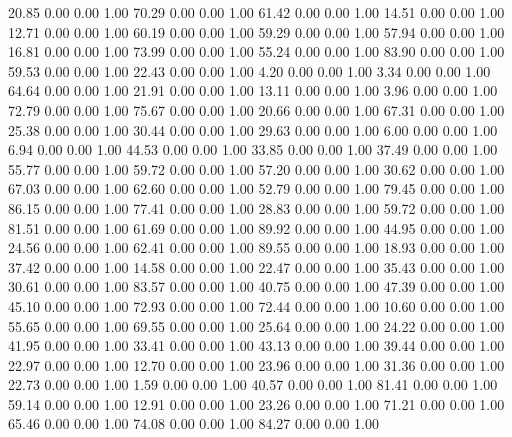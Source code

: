    20.85   0.00   0.00   1.00
   70.29   0.00   0.00   1.00
   61.42   0.00   0.00   1.00
   14.51   0.00   0.00   1.00
   12.71   0.00   0.00   1.00
   60.19   0.00   0.00   1.00
   59.29   0.00   0.00   1.00
   57.94   0.00   0.00   1.00
   16.81   0.00   0.00   1.00
   73.99   0.00   0.00   1.00
   55.24   0.00   0.00   1.00
   83.90   0.00   0.00   1.00
   59.53   0.00   0.00   1.00
   22.43   0.00   0.00   1.00
    4.20   0.00   0.00   1.00
    3.34   0.00   0.00   1.00
   64.64   0.00   0.00   1.00
   21.91   0.00   0.00   1.00
   13.11   0.00   0.00   1.00
    3.96   0.00   0.00   1.00
   72.79   0.00   0.00   1.00
   75.67   0.00   0.00   1.00
   20.66   0.00   0.00   1.00
   67.31   0.00   0.00   1.00
   25.38   0.00   0.00   1.00
   30.44   0.00   0.00   1.00
   29.63   0.00   0.00   1.00
    6.00   0.00   0.00   1.00
    6.94   0.00   0.00   1.00
   44.53   0.00   0.00   1.00
   33.85   0.00   0.00   1.00
   37.49   0.00   0.00   1.00
   55.77   0.00   0.00   1.00
   59.72   0.00   0.00   1.00
   57.20   0.00   0.00   1.00
   30.62   0.00   0.00   1.00
   67.03   0.00   0.00   1.00
   62.60   0.00   0.00   1.00
   52.79   0.00   0.00   1.00
   79.45   0.00   0.00   1.00
   86.15   0.00   0.00   1.00
   77.41   0.00   0.00   1.00
   28.83   0.00   0.00   1.00
   59.72   0.00   0.00   1.00
   81.51   0.00   0.00   1.00
   61.69   0.00   0.00   1.00
   89.92   0.00   0.00   1.00
   44.95   0.00   0.00   1.00
   24.56   0.00   0.00   1.00
   62.41   0.00   0.00   1.00
   89.55   0.00   0.00   1.00
   18.93   0.00   0.00   1.00
   37.42   0.00   0.00   1.00
   14.58   0.00   0.00   1.00
   22.47   0.00   0.00   1.00
   35.43   0.00   0.00   1.00
   30.61   0.00   0.00   1.00
   83.57   0.00   0.00   1.00
   40.75   0.00   0.00   1.00
   47.39   0.00   0.00   1.00
   45.10   0.00   0.00   1.00
   72.93   0.00   0.00   1.00
   72.44   0.00   0.00   1.00
   10.60   0.00   0.00   1.00
   55.65   0.00   0.00   1.00
   69.55   0.00   0.00   1.00
   25.64   0.00   0.00   1.00
   24.22   0.00   0.00   1.00
   41.95   0.00   0.00   1.00
   33.41   0.00   0.00   1.00
   43.13   0.00   0.00   1.00
   39.44   0.00   0.00   1.00
   22.97   0.00   0.00   1.00
   12.70   0.00   0.00   1.00
   23.96   0.00   0.00   1.00
   31.36   0.00   0.00   1.00
   22.73   0.00   0.00   1.00
    1.59   0.00   0.00   1.00
   40.57   0.00   0.00   1.00
   81.41   0.00   0.00   1.00
   59.14   0.00   0.00   1.00
   12.91   0.00   0.00   1.00
   23.26   0.00   0.00   1.00
   71.21   0.00   0.00   1.00
   65.46   0.00   0.00   1.00
   74.08   0.00   0.00   1.00
   84.27   0.00   0.00   1.00
